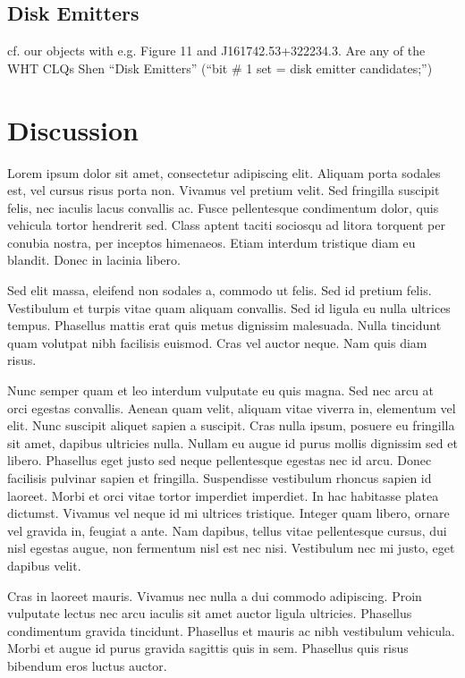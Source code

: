 \documentclass[a4paper,fleqn,usenatbib]{mnras}
\begin{document}
\subsection{Disk Emitters} 
cf. our objects with e.g. Figure 11 \citet{Shen2011} and J161742.53+322234.3. 
Are any of the WHT CLQs Shen ``Disk Emitters''  
(``bit \# 1 set = disk emitter candidates;'')


\section{Discussion}\label{sec:discussion} 
Lorem ipsum dolor sit amet, consectetur adipiscing elit. Aliquam porta sodales est, vel cursus risus porta non. Vivamus vel pretium velit. Sed fringilla suscipit felis, nec iaculis lacus convallis ac. Fusce pellentesque condimentum dolor, quis vehicula tortor hendrerit sed. Class aptent taciti sociosqu ad litora torquent per conubia nostra, per inceptos himenaeos. Etiam interdum tristique diam eu blandit. Donec in lacinia libero.

Sed elit massa, eleifend non sodales a, commodo ut felis. Sed id pretium felis. Vestibulum et turpis vitae quam aliquam convallis. Sed id ligula eu nulla ultrices tempus. Phasellus mattis erat quis metus dignissim malesuada. Nulla tincidunt quam volutpat nibh facilisis euismod. Cras vel auctor neque. Nam quis diam risus.

Nunc semper quam et leo interdum vulputate eu quis magna. Sed nec arcu at orci egestas convallis. Aenean quam velit, aliquam vitae viverra in, elementum vel elit. Nunc suscipit aliquet sapien a suscipit. Cras nulla ipsum, posuere eu fringilla sit amet, dapibus ultricies nulla. Nullam eu augue id purus mollis dignissim sed et libero. Phasellus eget justo sed neque pellentesque egestas nec id arcu. Donec facilisis pulvinar sapien et fringilla. Suspendisse vestibulum rhoncus sapien id laoreet. Morbi et orci vitae tortor imperdiet imperdiet. In hac habitasse platea dictumst. Vivamus vel neque id mi ultrices tristique. Integer quam libero, ornare vel gravida in, feugiat a ante. Nam dapibus, tellus vitae pellentesque cursus, dui nisl egestas augue, non fermentum nisl est nec nisi. Vestibulum nec mi justo, eget dapibus velit.

Cras in laoreet mauris. Vivamus nec nulla a dui commodo adipiscing. Proin vulputate lectus nec arcu iaculis sit amet auctor ligula ultricies. Phasellus condimentum gravida tincidunt. Phasellus et mauris ac nibh vestibulum vehicula. Morbi et augue id purus gravida sagittis quis in sem. Phasellus quis risus bibendum eros luctus auctor.
\end{document}
